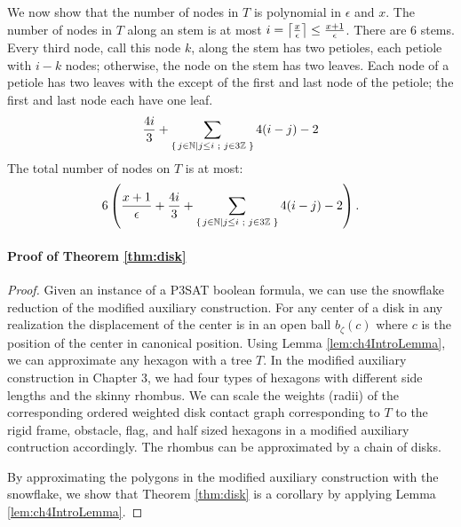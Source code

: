 We now show that the number of nodes in $T$ is polynomial in $\epsilon$ and $x$.  
The number of nodes in $T$ along an stem is at most $i=\left\lceil \frac{x}{\epsilon} \right\rceil \leq \frac{x+1}{\epsilon}$.  There are 6 stems.
Every third node, call this node $k$, along the stem has two petioles, each petiole with $i-k$ nodes; otherwise, the node on the stem has two leaves.  
Each node of a petiole has two leaves with the except of the first and last node of the petiole; the first and last node each have one leaf.   
$$\frac{4i}{3}  + \sum_{{\left\lbrace \left. j \in {\mathbb{N}} \left\vert j \leq i \text{ ; } j \in 3{\mathbb{Z}} \right.\right.\right\rbrace }} 4(i - j) - 2$$
The total number of nodes on $T$ is at most:
$$6 \left( \frac{x+1}{\epsilon} + \frac{4i}{3}   + \sum_{{\left\lbrace \left. j \in {\mathbb{N}} \left\vert j \leq i \text{ ; } j \in 3{\mathbb{Z}} \right.\right.\right\rbrace }} 4(i - j) - 2 \right).$$









   



\paragraph{Proof of Theorem \ref{thm:disk}}

\begin{proof}
Given an instance of a P3SAT boolean formula, we can use the snowflake reduction of the modified auxiliary construction.  
For any center of a disk in any realization the displacement of the center is in an open ball $b_{\zeta}(c)$ where $c$ is the position of the center in canonical position.  
Using Lemma \ref{lem:ch4IntroLemma}, we can approximate any hexagon with a tree $T$.  
In the modified auxiliary construction in Chapter 3, we had four types of hexagons with different side lengths and the skinny rhombus.  
We can scale the weights (radii) of the corresponding ordered weighted disk contact graph corresponding to $T$ to the rigid frame, obstacle, flag, and half sized hexagons in a modified auxiliary contruction accordingly.  
The rhombus can be approximated by a chain of disks.

By approximating the polygons in the modified auxiliary construction with the snowflake, we show that Theorem \ref{thm:disk} is a corollary by applying Lemma \ref{lem:ch4IntroLemma}.  
\end{proof}

